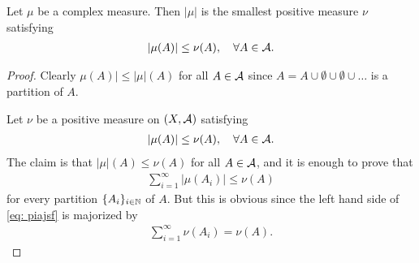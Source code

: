 \documentclass[../../main.tex]{subfiles}
\begin{document}
\begin{theorem}
Let $\mu$ be a complex measure. Then $|\mu|$ is the smallest positive measure $\nu$ satisfying
\begin{align*}
	|\mu(A)| \le \nu(A), \quad \forall A\in \mathcal{A}.
\end{align*}
\end{theorem}
\begin{proof}
Clearly $\mu(A)| \le |\mu|(A)$ for all $A\in \mathcal{A}$ since $A=A\cup\emptyset \cup \emptyset \cup \dots$ is a partition of $A$.

Let $\nu$ be a positive measure on $(X, \mathcal{A})$ satisfying
\begin{align}
	|\mu(A)|\le \nu(A), \quad \forall A\in \mathcal{A}. \label{eq: piajsf}
\end{align}
The claim is that $|\mu|(A)\le \nu(A)$ for all $A\in \mathcal{A}$, and it is enough to prove that
\begin{align*}
	\sum_{i=1}^{\infty}|\mu(A_{i})| \le \nu(A)
\end{align*}
for every partition $\{A_{i}\}_{i\in \mathbb{N}}$ of $A$. But this is obvious since the left hand side of \eqref{eq: piajsf} is majorized by
\begin{align*}
	\sum_{i=1}^{\infty}\nu(A_{i})=\nu(A).
\end{align*}
\end{proof}
\end{document}
